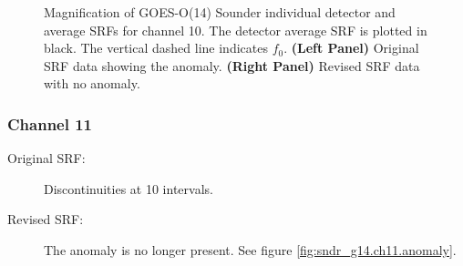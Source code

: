 \begin{figure}[htp]
\begin{tabular}{c c}
  \end{tabular}
  \caption{Magnification of GOES-O(14) Sounder individual detector and average SRFs for channel 10. The detector average SRF is plotted in black. The vertical dashed line indicates $f_0$. \textbf{(Left Panel)} Original SRF data showing the anomaly. \textbf{(Right Panel)} Revised SRF data with no anomaly.}
  \label{fig:sndr_g14.ch10.anomaly}
\end{figure}

\subsubsection{Channel 11}
\begin{description}
  \item[Original SRF:] Discontinuities at 10\invcm{} intervals.
  \item[Revised SRF:]  The anomaly is no longer present. See figure \ref{fig:sndr_g14.ch11.anomaly}.
\end{description}

